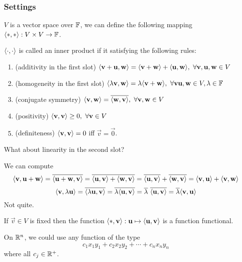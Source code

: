 \subsubsection*{Settings}
$V$ is a vector space over $\mathbb F$, we can define the following mapping $ \langle \ast, \ast \rangle : V \times V \to \mathbb F$.
\begin{definition}
$\langle \cdot, \cdot \rangle$ is called an inner product if it satisfying the following rules:
\begin{enumerate}
    \item(additivity in the first slot) $\langle \mathbf v + \mathbf u, \mathbf w \rangle = \langle \mathbf v + \mathbf w \rangle + \langle \mathbf u, \mathbf w \rangle, \ \forall \mathbf v, \mathbf u, \mathbf w \in V$
    \item(homogeneity in the first slot) $\langle \lambda \mathbf v, \mathbf w \rangle = \lambda \langle \mathbf v + \mathbf w \rangle, \ \forall \mathbf v \mathbf u, \mathbf w \in V, \lambda \in \mathbb F$
    \item(conjugate symmetry) $\langle \mathbf v, \mathbf w \rangle = \overline{\langle \mathbf w, \mathbf v \rangle}, \ \forall \mathbf v,\mathbf w \in V$
    \item(positivity) $\langle \mathbf v, \mathbf v \rangle \geq 0, \ \forall \mathbf v \in V$
    \item(definiteness) $\langle \mathbf v, \mathbf v \rangle = 0$ iff $\vec v = \vec 0$.
\end{enumerate}
\end{definition}
\begin{question}
What about linearity in the second slot?
\end{question}
\begin{answer} We can compute
\[ \langle \mathbf v, \mathbf u + \mathbf w \rangle = \overline{\langle \mathbf u + \mathbf w, \mathbf v\rangle} = \overline{\langle \mathbf u, \mathbf v \rangle + \langle \mathbf w, \mathbf v \rangle} = \overline{\langle \mathbf u, \mathbf v \rangle} + \overline{\langle \mathbf w, \mathbf v\rangle } = \langle \mathbf v, \mathbf u\rangle + \langle \mathbf v, \mathbf w\rangle\]
\[ \langle \mathbf v, \lambda \mathbf u\rangle = \overline{\langle \lambda \mathbf u, \mathbf v\rangle} = \overline{\lambda \langle \mathbf u,\mathbf v\rangle} = \overline \lambda \ \overline{\langle \mathbf u, \mathbf v\rangle} = \overline \lambda \langle \mathbf v, \mathbf u \rangle\]
Not quite. \frownie{}
\end{answer}
\begin{remark}
    If $\vec v \in V$ is fixed then the function $\langle \ast, \mathbf v \rangle : \mathbf u \mapsto \langle \mathbf u, \mathbf v \rangle$ is a function functional. 
\end{remark}
\begin{example}
    On $\mathbb R^n$, we could use any function of the type
    \[ c_1x_1y_1 + c_2x_2y_2 + \cdots + c_nx_ny_n\] where all $c_j \in \mathbb R^+$.
\end{example}
